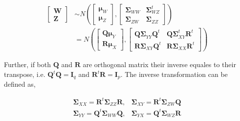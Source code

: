 \documentclass[12pt,a4paperpaper,authoryear]{elsarticle} %
\begin{document}
\begin{align}
  \begin{bmatrix}\mathbf{W} \\ 
  \boldsymbol{Z}\end{bmatrix}  & \sim N \left(
    \begin{bmatrix}
      \boldsymbol{\mu}_W \\ \boldsymbol{\mu}_Z
    \end{bmatrix},
    \begin{bmatrix}
      \boldsymbol{\Sigma}_{WW} & \boldsymbol{\Sigma}_{WZ}^t \\
      \boldsymbol{\Sigma}_{ZW} & \boldsymbol{\Sigma}_{ZZ}
    \end{bmatrix} \right) \nonumber \\
  & = N \left(
    \begin{bmatrix}
      \boldsymbol{Q\mu}_Y \\
      \boldsymbol{R\mu}_X
    \end{bmatrix},
    \begin{bmatrix}
      \boldsymbol{Q\Sigma}_{YY}\boldsymbol{Q}^t & \boldsymbol{Q\Sigma}_{XY}^t\mathbf{R}^t \\
      \boldsymbol{R\Sigma}_{XY}\boldsymbol{Q}^t & \boldsymbol{R\Sigma}_{XX}\mathbf{R}^t
    \end{bmatrix}
  \right)
  \label{eq:model3}
\end{align}

Further, if both \(\mathbf{Q}\) and \(\mathbf{R}\) are orthogonal matrix
their inverse equales to their transpose, i.e.
\(\mathbf{Q}^t\mathbf{Q} = \mathbf{I}_q\) and
\(\mathbf{R}^t\mathbf{R} = \mathbf{I}_p\). The inverse transformation
can be defined as,

\begin{align}
\boldsymbol{\Sigma}_{XX}                                                                                                                                                                          = \boldsymbol{R}^t\boldsymbol{\Sigma}_{ZZ}  \boldsymbol{R}, & \boldsymbol{\Sigma}_{XY}
    = \boldsymbol{R}^t \boldsymbol{\Sigma}_{ZW} \boldsymbol{Q} \nonumber \\
\boldsymbol{\Sigma}_{YY}                                                                                                                                                                          = \boldsymbol{Q}^t\boldsymbol{\Sigma}_{WW} \boldsymbol{Q}, & \boldsymbol{\Sigma}_{YX} = \boldsymbol{Q}^t \boldsymbol{\Sigma}_{WZ} \boldsymbol{R}
\label{eq:cov-yx-wz}
\end{align}
\end{document}
